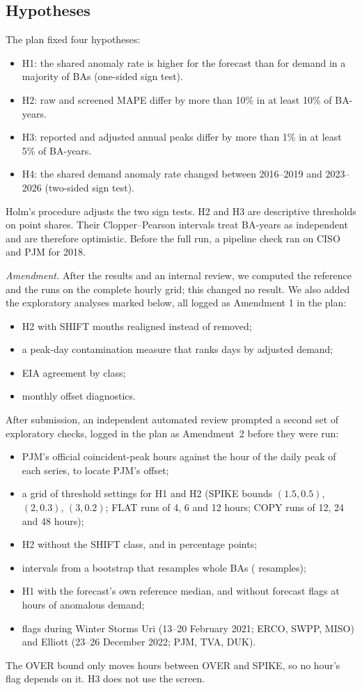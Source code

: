 \documentclass[conference,a4paper]{IEEEtran}
\begin{document}
\subsection{Hypotheses}
The plan fixed four hypotheses:
\begin{itemize}
\item H1: the shared anomaly rate is higher for the forecast than for demand in a majority of BAs (one-sided sign test).
\item H2: raw and screened MAPE differ by more than 10\% in at least 10\% of BA-years.
\item H3: reported and adjusted annual peaks differ by more than 1\% in at least 5\% of BA-years.
\item H4: the shared demand anomaly rate changed between 2016--2019 and 2023--2026 (two-sided sign test).
\end{itemize}
Holm's procedure \cite{holm1979simple} adjusts the two sign tests. H2 and H3 are descriptive thresholds on point shares. Their Clopper--Pearson intervals \cite{clopper1934use} treat BA-years as independent and are therefore optimistic. Before the full run, a pipeline check ran on CISO and PJM for 2018.

\emph{Amendment.} After the results and an internal review, we computed the reference and the runs on the complete hourly grid; this changed no result. We also added the exploratory analyses marked below, all logged as Amendment 1 in the plan:
\begin{itemize}
\item H2 with SHIFT months realigned instead of removed;
\item a peak-day contamination measure that ranks days by adjusted demand;
\item EIA agreement by class;
\item monthly offset diagnostics.
\end{itemize}
After submission, an independent automated review prompted a second set of exploratory checks, logged in the plan as Amendment~2 before they were run:
\begin{itemize}
\item PJM's official coincident-peak hours \cite{pjm5cp} against the hour of the daily peak of each series, to locate PJM's offset;
\item a grid of  threshold settings for H1 and H2 (SPIKE bounds $(1.5, 0.5)$, $(2, 0.3)$, $(3, 0.2)$; FLAT runs of 4, 6 and 12 hours; COPY runs of 12, 24 and 48 hours);
\item H2 without the SHIFT class, and in percentage points;
\item intervals from a bootstrap that resamples whole BAs ( resamples);
\item H1 with the forecast's own reference median, and without forecast flags at hours of anomalous demand;
\item flags during Winter Storms Uri (13--20 February 2021; ERCO, SWPP, MISO) and Elliott (23--26 December 2022; PJM, TVA, DUK).
\end{itemize}
The OVER bound only moves hours between OVER and SPIKE, so no hour's flag depends on it. H3 does not use the screen.
\end{document}
